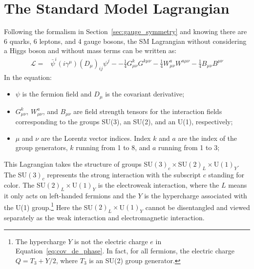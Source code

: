 \section{The Standard Model Lagrangian}\label{sec:SM_Lagrangian}

Following the formalism in Section~\ref{sec:gauge_symmetry} and knowing there are 6 quarks, 6 leptons, and 4 gauge bosons,
the SM Lagrangian without considering a Higgs boson and without mass terms can be written as:
\begin{equation}\label{eq:SM_Lagrangian}
  \begin{split}
    \mathcal{L} = & \bar{\psi}^{i} (i\gamma^{\mu})(D_{\mu})_{ij}\psi^{j} -
                  - \frac{1}{4} G^{k}_{\mu\nu}G^{k\mu\nu}
                  - \frac{1}{4} W^{a}_{\mu\nu}W^{a\mu\nu}
                  - \frac{1}{4} B_{\mu\nu}B^{\mu\nu}
  \end{split}
\end{equation}
In the equation:
\begin{itemize}
  \item $\psi$ is the fermion field and $D_{\mu}$ is the covariant derivative;
  \item $G^{k}_{\mu\nu}$, $W^{a}_{\mu\nu}$, and $B_{\mu\nu}$ are field strength tensors for the interaction fields 
        corresponding to the groups SU(3), an SU(2), and an U(1), respectively;
  \item $\mu$ and $\nu$ are the Lorentz vector indices. Index $k$ and $a$ are the index of the group generators, $k$ running from 1 to 8, and $a$ running from 1 to 3;
\end{itemize}


This Lagrangian takes the structure of groups SU$(3)_{c} \times$SU$(2)_{L} \times$U$(1)_{Y}$.
The SU$(3)_{c}$ represents the strong interaction with the subscript $c$ standing for color.
The SU$(2)_{L} \times$U$(1)_{Y}$ is the electroweak interaction, 
where the $L$ means it only acts on left-handed fermions
and the $Y$ is the hypercharge associated with the U(1) group.\footnote{The hypercharge $Y$ is not the electric charge $e$ in Equation~\ref{eq:cov_de_phase}.
In fact, for all fermions, the electric charge $Q = T_{3} + Y/2$, where $T_{3}$ is an SU(2) group generator.}
Here the SU$(2)_{L} \times$U$(1)_{Y}$ cannot be disentangled and viewed separately as the weak interaction and electromagnetic interaction.

